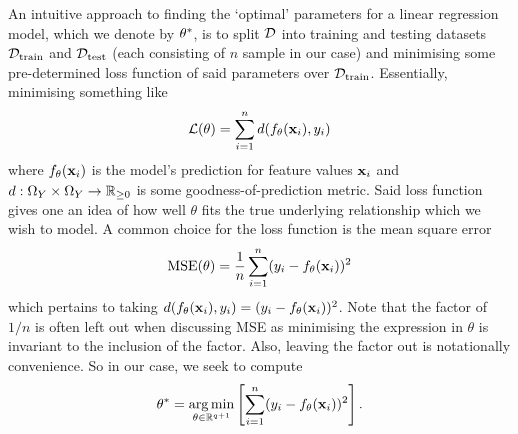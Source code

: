 \documentclass[11pt]{article}
\begin{document}
An intuitive approach to finding the `optimal' parameters for a linear regression model, which we denote by $\theta^{*}$, is to split $\mathcal{D}$ into training and testing datasets $\mathcal{D}_{\text{train}}$ and $\mathcal{D}_{\text{test}}$ (each consisting of $n$ sample in our case) and minimising some pre-determined loss function of said parameters over $\mathcal{D}_{\text{train}}$. Essentially, minimising something like
$$
\mathcal{L}(\theta)=\sum_{i=1}^nd(f_{\theta}(\mathbf{x}_i), y_i)
$$
where $f_{\theta}(\mathbf{x}_i)$ is the model's prediction for feature values $\mathbf{x}_i$ and $d:\Omega_Y\times\Omega_Y\rightarrow\mathbb{R}_{\geq0}$ is some goodness-of-prediction metric. Said loss function gives one an idea of how well $\theta$ fits the true underlying relationship which we wish to model. A common choice for the loss function is the mean square error
$$
\text{MSE}(\theta)=\frac{1}{n}\sum_{i=1}^n(y_i-f_{\theta}(\mathbf{x}_i))^2
$$
which pertains to taking $d(f_{\theta}(\mathbf{x}_i), y_i)=(y_i-f_{\theta}(\mathbf{x}_i))^2$. Note that the factor of $1/n$ is often left out when discussing MSE as minimising the expression in $\theta$ is invariant to the inclusion of the factor. Also, leaving the factor out is notationally convenience. So in our case, we seek to compute
$$
\theta^{*}=\operatorname*{arg\,min}_{\theta\in\mathbb{R}^{q+1}}\left[\sum_{i=1}^n(y_i-f_{\theta}(\mathbf{x}_i))^2\right].
$$
\end{document}
